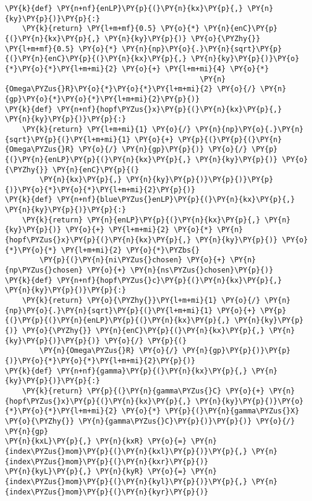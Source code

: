 \begin{Verbatim}[commandchars=\\\{\}]
\PY{k}{def} \PY{n+nf}{enLP}\PY{p}{(}\PY{n}{kx}\PY{p}{,} \PY{n}{ky}\PY{p}{)}\PY{p}{:}
    \PY{k}{return} \PY{l+m+mf}{0.5} \PY{o}{*} \PY{n}{enC}\PY{p}{(}\PY{n}{kx}\PY{p}{,} \PY{n}{ky}\PY{p}{)} \PY{o}{\PYZhy{}} \PY{l+m+mf}{0.5} \PY{o}{*} \PY{n}{np}\PY{o}{.}\PY{n}{sqrt}\PY{p}{(}\PY{n}{enC}\PY{p}{(}\PY{n}{kx}\PY{p}{,} \PY{n}{ky}\PY{p}{)}\PY{o}{*}\PY{o}{*}\PY{l+m+mi}{2} \PY{o}{+} \PY{l+m+mi}{4} \PY{o}{*}
                                             \PY{n}{Omega\PYZus{}R}\PY{o}{*}\PY{o}{*}\PY{l+m+mi}{2} \PY{o}{/} \PY{n}{gp}\PY{o}{*}\PY{o}{*}\PY{l+m+mi}{2}\PY{p}{)}
\PY{k}{def} \PY{n+nf}{hopf\PYZus{}x}\PY{p}{(}\PY{n}{kx}\PY{p}{,} \PY{n}{ky}\PY{p}{)}\PY{p}{:}
    \PY{k}{return} \PY{l+m+mi}{1} \PY{o}{/} \PY{n}{np}\PY{o}{.}\PY{n}{sqrt}\PY{p}{(}\PY{l+m+mi}{1} \PY{o}{+} \PY{p}{(}\PY{p}{(}\PY{n}{Omega\PYZus{}R} \PY{o}{/} \PY{n}{gp}\PY{p}{)} \PY{o}{/} \PY{p}{(}\PY{n}{enLP}\PY{p}{(}\PY{n}{kx}\PY{p}{,} \PY{n}{ky}\PY{p}{)} \PY{o}{\PYZhy{}} \PY{n}{enC}\PY{p}{(}
        \PY{n}{kx}\PY{p}{,} \PY{n}{ky}\PY{p}{)}\PY{p}{)}\PY{p}{)}\PY{o}{*}\PY{o}{*}\PY{l+m+mi}{2}\PY{p}{)}
\PY{k}{def} \PY{n+nf}{blue\PYZus{}enLP}\PY{p}{(}\PY{n}{kx}\PY{p}{,} \PY{n}{ky}\PY{p}{)}\PY{p}{:}
    \PY{k}{return} \PY{n}{enLP}\PY{p}{(}\PY{n}{kx}\PY{p}{,} \PY{n}{ky}\PY{p}{)} \PY{o}{+} \PY{l+m+mi}{2} \PY{o}{*} \PY{n}{hopf\PYZus{}x}\PY{p}{(}\PY{n}{kx}\PY{p}{,} \PY{n}{ky}\PY{p}{)} \PY{o}{*}\PY{o}{*} \PY{l+m+mi}{2} \PY{o}{*}\PYZbs{}
        \PY{p}{(}\PY{n}{ni\PYZus{}chosen} \PY{o}{+} \PY{n}{np\PYZus{}chosen} \PY{o}{+} \PY{n}{ns\PYZus{}chosen}\PY{p}{)}
\PY{k}{def} \PY{n+nf}{hopf\PYZus{}c}\PY{p}{(}\PY{n}{kx}\PY{p}{,} \PY{n}{ky}\PY{p}{)}\PY{p}{:}
    \PY{k}{return} \PY{o}{\PYZhy{}}\PY{l+m+mi}{1} \PY{o}{/} \PY{n}{np}\PY{o}{.}\PY{n}{sqrt}\PY{p}{(}\PY{l+m+mi}{1} \PY{o}{+} \PY{p}{(}\PY{p}{(}\PY{n}{enLP}\PY{p}{(}\PY{n}{kx}\PY{p}{,} \PY{n}{ky}\PY{p}{)} \PY{o}{\PYZhy{}} \PY{n}{enC}\PY{p}{(}\PY{n}{kx}\PY{p}{,} \PY{n}{ky}\PY{p}{)}\PY{p}{)} \PY{o}{/} \PY{p}{(}
        \PY{n}{Omega\PYZus{}R} \PY{o}{/} \PY{n}{gp}\PY{p}{)}\PY{p}{)}\PY{o}{*}\PY{o}{*}\PY{l+m+mi}{2}\PY{p}{)}
\PY{k}{def} \PY{n+nf}{gamma}\PY{p}{(}\PY{n}{kx}\PY{p}{,} \PY{n}{ky}\PY{p}{)}\PY{p}{:}
    \PY{k}{return} \PY{p}{(}\PY{n}{gamma\PYZus{}C} \PY{o}{+} \PY{n}{hopf\PYZus{}x}\PY{p}{(}\PY{n}{kx}\PY{p}{,} \PY{n}{ky}\PY{p}{)}\PY{o}{*}\PY{o}{*}\PY{l+m+mi}{2} \PY{o}{*} \PY{p}{(}\PY{n}{gamma\PYZus{}X} \PY{o}{\PYZhy{}} \PY{n}{gamma\PYZus{}C}\PY{p}{)}\PY{p}{)} \PY{o}{/} \PY{n}{gp}
\PY{n}{kxL}\PY{p}{,} \PY{n}{kxR} \PY{o}{=} \PY{n}{index\PYZus{}mom}\PY{p}{(}\PY{n}{kxl}\PY{p}{)}\PY{p}{,} \PY{n}{index\PYZus{}mom}\PY{p}{(}\PY{n}{kxr}\PY{p}{)}
\PY{n}{kyL}\PY{p}{,} \PY{n}{kyR} \PY{o}{=} \PY{n}{index\PYZus{}mom}\PY{p}{(}\PY{n}{kyl}\PY{p}{)}\PY{p}{,} \PY{n}{index\PYZus{}mom}\PY{p}{(}\PY{n}{kyr}\PY{p}{)}

\end{Verbatim}
